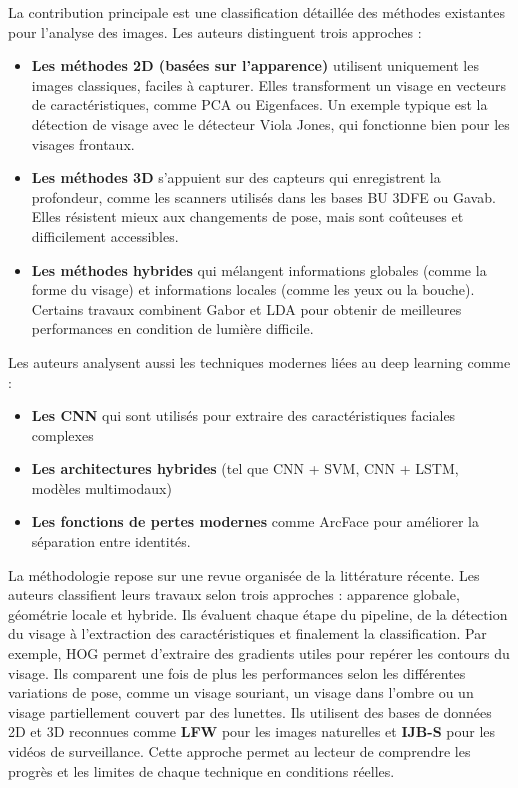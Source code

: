 \documentclass[11pt]{article}
\begin{document}
La contribution principale est une classification détaillée des méthodes existantes pour l'analyse des images. Les auteurs 
distinguent trois approches :
\begin{itemize}
    \item \textbf{Les méthodes 2D (basées sur l’apparence)} utilisent uniquement les images    classiques, faciles à capturer. 
Elles transforment un visage en vecteurs de caractéristiques, comme PCA ou Eigenfaces. Un exemple typique est la détection de 
visage avec le détecteur Viola Jones, qui fonctionne bien pour les visages frontaux.
    \item \textbf{Les méthodes 3D} s’appuient sur des capteurs qui enregistrent la profondeur, comme les scanners utilisés dans 
les bases BU 3DFE ou Gavab. Elles résistent mieux aux changements de pose, mais sont coûteuses et difficilement accessibles.
    \item \textbf{Les méthodes hybrides } qui mélangent informations globales (comme la forme du visage) et informations locales 
(comme les yeux ou la bouche). Certains travaux combinent Gabor et LDA pour obtenir de meilleures performances en condition de 
lumière difficile.
\end{itemize}
Les auteurs analysent aussi les techniques modernes liées au deep learning comme : 
\begin{itemize}
    \item \textbf{Les CNN} qui sont utilisés pour extraire des caractéristiques faciales complexes
    \item \textbf{Les architectures hybrides} (tel que CNN + SVM, CNN + LSTM, modèles multimodaux)
    \item \textbf{Les fonctions de pertes modernes} comme ArcFace pour améliorer la séparation entre identités.
\end{itemize}
La méthodologie repose sur une revue organisée de la littérature récente. Les auteurs classifient leurs travaux selon trois 
approches : apparence globale, géométrie locale et hybride. Ils évaluent chaque étape du pipeline, de la détection du visage à 
l’extraction des caractéristiques et finalement la classification. Par exemple, HOG permet d’extraire des gradients utiles pour 
repérer les contours du visage. Ils comparent une fois de plus les performances selon les différentes variations de pose, comme 
un visage souriant, un visage dans l’ombre ou un visage partiellement couvert par des lunettes. Ils utilisent des bases de 
données 2D et 3D reconnues comme \textbf{LFW} pour les images naturelles et \textbf{IJB-S} pour les vidéos de surveillance. 
Cette approche permet au lecteur de comprendre les progrès et les limites de chaque technique en conditions réelles.
\end{document}
